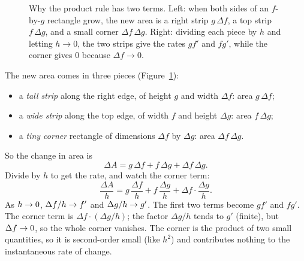 \begin{figure}[H]
\caption{Why the product rule has two terms. Left: when both sides of an $f$-by-$g$
rectangle grow, the new area is a right strip $g\,\Delta f$, a top strip $f\,\Delta g$,
and a small corner $\Delta f\,\Delta g$. Right: dividing each piece by $h$ and letting
$h\to 0$, the two strips give the rates $g f'$ and $f g'$, while the corner gives $0$
because $\Delta f \to 0$.}
\label{ch11:fig-product}
\end{figure}

The new area comes in three pieces (Figure~\ref{ch11:fig-product}):
\begin{itemize}
  \item a \emph{tall strip} along the right edge, of height $g$ and width $\Delta f$:
        area $g\,\Delta f$;
  \item a \emph{wide strip} along the top edge, of width $f$ and height $\Delta g$:
        area $f\,\Delta g$;
  \item a \emph{tiny corner} rectangle of dimensions $\Delta f$ by $\Delta g$:
        area $\Delta f\,\Delta g$.
\end{itemize}
So the change in area is
\[
  \Delta A = g\,\Delta f + f\,\Delta g + \Delta f\,\Delta g .
\]
Divide by $h$ to get the rate, and watch the corner term:
\[
  \frac{\Delta A}{h} = g\,\frac{\Delta f}{h} + f\,\frac{\Delta g}{h}
                       + \Delta f\cdot\frac{\Delta g}{h}.
\]
As $h\to 0$, $\Delta f/h \to f'$ and $\Delta g/h \to g'$. The first two terms become
$g f'$ and $f g'$. The corner term is $\Delta f\cdot(\Delta g/h)$; the factor $\Delta g/h$
tends to $g'$ (finite), but $\Delta f \to 0$, so the whole corner vanishes.
The corner is the product of two small quantities, so it is second-order small (like
$h^2$) and contributes nothing to the instantaneous rate of change.

